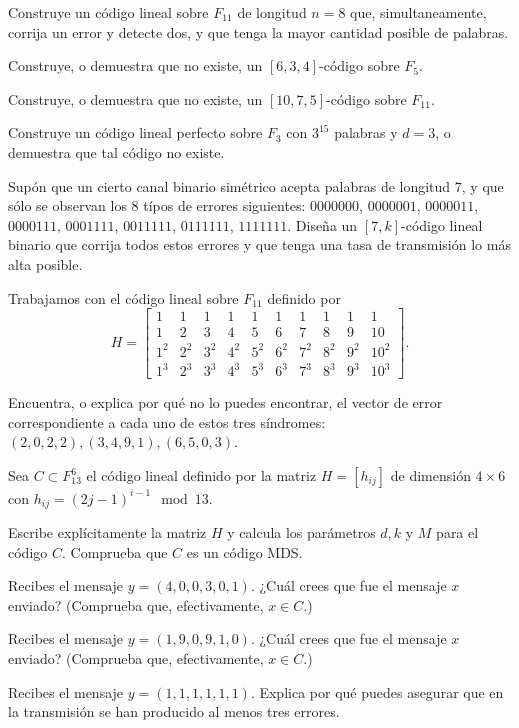 \begin{problem}[9]
Construye un código lineal sobre $ F_{11}$ de longitud $n=8$
que, simultaneamente, corrija un error y detecte dos, y que tenga
la mayor cantidad posible de palabras.
\solution
\end{problem}

\begin{problem}[10]
\ppart Construye, o demuestra que no existe, un $[6,3,4]$-código
sobre  $ F_5$.

\ppart Construye, o demuestra que no existe, un $[10,7,5]$-código sobre  $ F_{11}$.

\ppart Construye un código lineal perfecto sobre $ F_3$ con $3^{15}$
palabras y $d=3$, o demuestra que tal código no existe.

\solution
\end{problem}

\begin{problem}[11]
 Supón que un cierto canal binario simétrico acepta palabras
de longitud $7$, y que sólo se observan los $8$ típos de errores
siguientes: $0000000$, $0000001$, $0000011$, $0000111$, $0001111$,
$0011111$, $0111111$, $1111111$. Diseña un $[7,k]$-código lineal
binario que corrija todos estos errores y que tenga una tasa de
transmisión lo más alta posible.
\solution
\end{problem}

\begin{problem}[12]
Trabajamos con el código lineal sobre $ F_{11}$ definido por
$$H=\left[\begin{array}{cccccccccc}
 1&1&1&1&1&1&1&1&1&1\\
 1&2&3&4&5&6&7&8&9&10\\
 1^2&2^2&3^2&4^2&5^2&6^2&7^2&8^2&9^2&10^2\\
 1^3&2^3&3^3&4^3&5^3&6^3&7^3&8^3&9^3&10^3 \end{array}\right].$$

Encuentra, o explica por qué no lo puedes encontrar, el vector de
error correspondiente a cada uno de estos tres síndromes:
$(2,0,2,2),(3,4,9,1),(6,5,0,3)$.
\solution
\end{problem}

\begin{problem}[13]
Sea $ C\subset F_{13}^6$ el código lineal definido por
la matriz $H=[h_{ij}]$ de dimensión $4\times6$ con
$h_{ij}=(2j-1)^{i-1} \mod 13$.

\ppart  Escribe explícitamente la matriz $H$ y calcula los parámetros
$d, k$ y $M$ para el código $  C$. Comprueba que $ C$ es un código
MDS.

\ppart Recibes el mensaje $y=(4,0,0,3,0,1)$. ¿Cuál crees que fue el
mensaje $x$ enviado? (Comprueba que, efectivamente, $x\in  C$.)

\ppart Recibes el mensaje $y=(1,9,0,9,1,0)$. ¿Cuál crees que fue el
mensaje $x$ enviado? (Comprueba que, efectivamente, $x\in C$.)

\ppart Recibes el mensaje $y=(1,1,1,1,1,1)$. Explica por qué puedes
asegurar que en la transmisión se han producido al menos tres
errores.

\solution
\end{problem}

